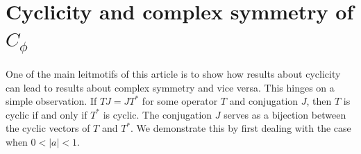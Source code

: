 \documentclass[11pt]{amsart}%
\numberwithin{equation}{section}
\theoremstyle{plain}
\newtheorem{cor}[thm]{Corollary}
\theoremstyle{definition}
\theoremstyle{definition}
\begin{document}







\section{Cyclicity and complex symmetry of  \texorpdfstring{$C_{\phi}$}{lg}}\label{s6}
One of the main leitmotifs of this article is to show how results about cyclicity can lead to results about complex symmetry and vice versa. This hinges on a simple observation. If $TJ=JT^*$ for some operator $T$ and conjugation $J$, then $T$ is cyclic if and only if $T^*$ is cyclic. The conjugation $J$ serves as a bijection between the cyclic vectors of $T$ and $T^*$. We demonstrate this by first dealing with the case when $0<|a|<1$.
\end{document}
